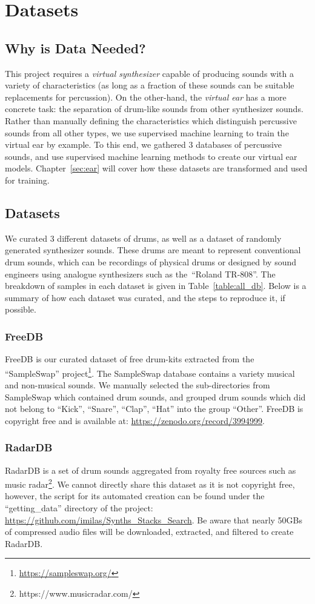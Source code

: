 \documentclass[\main/thesis.tex]{subfiles}
\begin{document}
\chapter{Datasets}
\label{sec:datasets}
\section{Why is Data Needed?}
This project requires a \textit{virtual synthesizer} capable of producing sounds with a variety of characteristics (as long as a fraction of these sounds can be suitable replacements for percussion). On the other-hand, the \textit{virtual ear} has a more concrete task: the separation of drum-like sounds from other synthesizer sounds. Rather than manually defining the characteristics which distinguish percussive sounds from all other types, we use supervised machine learning to train the virtual ear by example. To this end, we gathered 3 databases of percussive sounds, and use supervised machine learning methods to create our virtual ear models. Chapter~\ref{sec:ear} will cover how these datasets are transformed and used for training.


\section{Datasets}
We curated 3 different datasets of drums, as well as a dataset of randomly generated synthesizer sounds. These drums are meant to represent conventional drum sounds, which can be recordings of physical drums or designed by sound engineers using analogue synthesizers such as the~\enquote{Roland TR-808}.  The breakdown of samples in each dataset is given in Table~\ref{table:all_db}. Below is a summary of how each dataset was curated, and the steps to reproduce it, if possible. 
\subsection{FreeDB}
FreeDB is our curated dataset of free drum-kits extracted from the \enquote{SampleSwap} project\footnote{\url{https://sampleswap.org/}}. The SampleSwap database contains a variety musical and non-musical sounds. We manually selected the sub-directories from SampleSwap which contained drum sounds, and grouped drum sounds which did not belong to \enquote{Kick}, \enquote{Snare}, \enquote{Clap}, \enquote{Hat} into the group \enquote{Other}. FreeDB is copyright free and is available at: \url{https://zenodo.org/record/3994999}. 
\subsection{RadarDB}
RadarDB is a set of drum sounds aggregated from royalty free sources such as music radar\footnote{https://www.musicradar.com/}. We cannot directly share this dataset as it is not copyright free, however, the script for its automated creation can be found under the \enquote{getting\_data} directory of the project: \url{https://github.com/imilas/Synths_Stacks_Search}. Be aware that nearly 50GBs of compressed audio files will be downloaded, extracted, and filtered to create RadarDB. 
\end{document}
